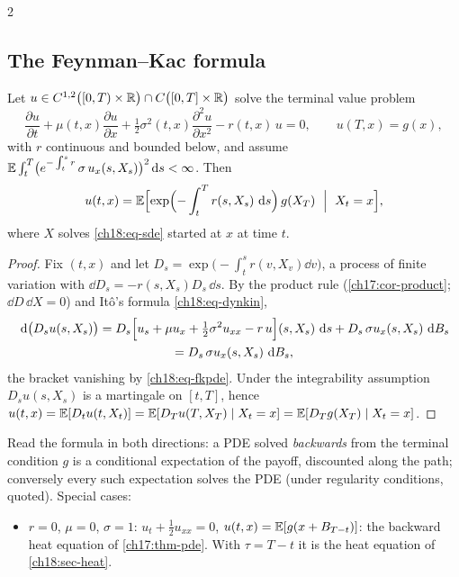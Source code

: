 \begin{paracol}{2}
\subsection{The Feynman--Kac formula}
\begin{theorem}\label{ch18:thm-fk}
Let $u\in C^{1,2}\bigl([0,T)\times\mathbb{R}\bigr)\cap C\bigl([0,T]\times\mathbb{R}\bigr)$ solve the terminal value problem
\begin{equation}\label{ch18:eq-fkpde}
  \frac{\partial u}{\partial t}+\mu(t,x)\frac{\partial u}{\partial x}+\tfrac12\sigma^2(t,x)\frac{\partial^2u}{\partial x^2}-r(t,x)\,u=0,\qquad u(T,x)=g(x),
\end{equation}
with $r$ continuous and bounded below, and assume $\mathbb{E}\int_t^T\bigl(e^{-\int_t^sr}\,\sigma\,u_x(s,X_s)\bigr)^2\,\mathrm{d} s<\infty$. Then
\begin{equation}\label{ch18:eq-fk}
  u(t,x)=\E\Bigl[\exp\Bigl(-\int_t^Tr(s,X_s)\,\dd s\Bigr)\,g(X_T)\ \Bigm|\ X_t=x\Bigr],
\end{equation}
where $X$ solves \eqref{ch18:eq-sde} started at $x$ at time $t$.
\end{theorem}
\begin{proof}
Fix $(t,x)$ and let $D_s=\exp\bigl(-\int_t^sr(v,X_v)\dd v\bigr)$, a process of finite variation with $\dd D_s=-r(s,X_s)D_s\,\dd s$. By the product rule (\cref{ch17:cor-product}; $\dd D\,\dd X=0$) and It\^o's formula \eqref{ch18:eq-dynkin},
\[
\begin{gathered}
  \,\mathrm{d}\bigl(D_su(s,X_s)\bigr)=D_s\Bigl[u_s+\mu u_x+\tfrac12\sigma^2u_{xx}-r\,u\Bigr](s,X_s)\,\,\mathrm{d} s+D_s\,\sigma u_x(s,X_s)\,\,\mathrm{d} B_s\\
  =D_s\,\sigma u_x(s,X_s)\,\,\mathrm{d} B_s ,
\end{gathered}
\]
the bracket vanishing by \eqref{ch18:eq-fkpde}. Under the integrability assumption $D_su(s,X_s)$ is a martingale on $[t,T]$, hence $u(t,x)=\mathbb{E}[D_tu(t,X_t)]=\mathbb{E}[D_Tu(T,X_T)\mid X_t=x]=\mathbb{E}[D_Tg(X_T)\mid X_t=x]$.
\end{proof}
Read the formula in both directions: a PDE solved \emph{backwards} from the terminal condition $g$ is a conditional expectation of the payoff, discounted along the path; conversely every such expectation solves the PDE (under regularity conditions, quoted). Special cases:
\begin{itemize}
  \item $r=0$, $\mu=0$, $\sigma=1$: $u_t+\tfrac12u_{xx}=0$, $u(t,x)=\mathbb{E}[g(x+B_{T-t})]$: the backward heat equation of \cref{ch17:thm-pde}. With $\tau=T-t$ it is the heat equation of \cref{ch18:sec-heat}.

\end{itemize}
\end{paracol}
